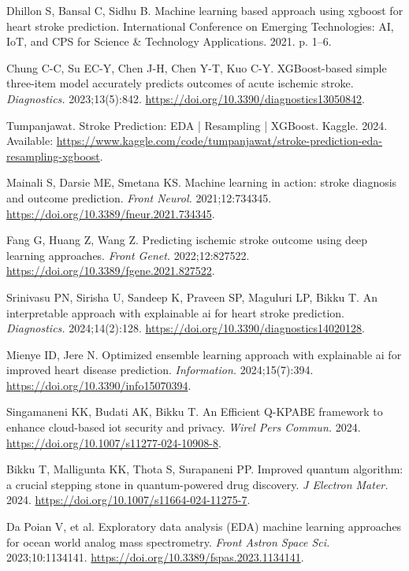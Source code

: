 \begin{enumerate}[label={[\arabic*]},leftmargin=1.2cm]
\item \hypertarget{bib:19}{}Dhillon S, Bansal C, Sidhu B. Machine learning based approach using xgboost for heart stroke prediction. International Conference on Emerging Technologies: AI, IoT, and CPS for Science \& Technology Applications. 2021. p. 1--6.
\item \hypertarget{bib:20}{}Chung C-C, Su EC-Y, Chen J-H, Chen Y-T, Kuo C-Y. XGBoost-based simple three-item model accurately predicts outcomes of acute ischemic stroke. \textit{Diagnostics.} 2023;13(5):842. \url{https://doi.org/10.3390/diagnostics13050842}.
\item \hypertarget{bib:21}{}Tumpanjawat. Stroke Prediction: EDA | Resampling | XGBoost. Kaggle. 2024. Available: \url{https://www.kaggle.com/code/tumpanjawat/stroke-prediction-eda-resampling-xgboost}.
\item \hypertarget{bib:22}{}Mainali S, Darsie ME, Smetana KS. Machine learning in action: stroke diagnosis and outcome prediction. \textit{Front Neurol.} 2021;12:734345. \url{https://doi.org/10.3389/fneur.2021.734345}.
\item \hypertarget{bib:23}{}Fang G, Huang Z, Wang Z. Predicting ischemic stroke outcome using deep learning approaches. \textit{Front Genet.} 2022;12:827522. \url{https://doi.org/10.3389/fgene.2021.827522}.
\item \hypertarget{bib:24}{}Srinivasu PN, Sirisha U, Sandeep K, Praveen SP, Maguluri LP, Bikku T. An interpretable approach with explainable ai for heart stroke prediction. \textit{Diagnostics.} 2024;14(2):128. \url{https://doi.org/10.3390/diagnostics14020128}.
\item \hypertarget{bib:25}{}Mienye ID, Jere N. Optimized ensemble learning approach with explainable ai for improved heart disease prediction. \textit{Information.} 2024;15(7):394. \url{https://doi.org/10.3390/info15070394}.
\item \hypertarget{bib:26}{}Singamaneni KK, Budati AK, Bikku T. An Efficient Q-KPABE framework to enhance cloud-based iot security and privacy. \textit{Wirel Pers Commun.} 2024. \url{https://doi.org/10.1007/s11277-024-10908-8}.
\item \hypertarget{bib:27}{}Bikku T, Malligunta KK, Thota S, Surapaneni PP. Improved quantum algorithm: a crucial stepping stone in quantum-powered drug discovery. \textit{J Electron Mater.} 2024. \url{https://doi.org/10.1007/s11664-024-11275-7}.
\item \hypertarget{bib:28}{}Da Poian V, et al. Exploratory data analysis (EDA) machine learning approaches for ocean world analog mass spectrometry. \textit{Front Astron Space Sci.} 2023;10:1134141. \url{https://doi.org/10.3389/fspas.2023.1134141}.

\end{enumerate}
